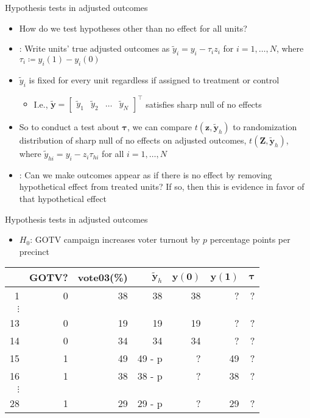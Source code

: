 \documentclass[table, xcolor = {dvipsnames}, 9pt]{beamer}
\theoremstyle{plain}
\begin{document}
\begin{frame}{Hypothesis tests in adjusted outcomes}
\vfill
\begin{itemize} 
\item How do we test hypotheses other than no effect for all units? \vfill
\item \citet{rosenbaum2002a,rosenbaum2010,rosenbaum2017a}: Write units' true adjusted outcomes as $\tilde{y}_i = y_i - \tau_i z_i$ for $i = 1, \ldots , N$, where $\tau_i \coloneqq y_i(1) - y_i(0)$ \vfill
\item $\tilde{y}_i$ is fixed for every unit regardless if assigned to treatment or control
\begin{itemize} \vfill
\item I.e., $\bm{\tilde{y}} = \begin{bmatrix} \tilde{y}_1 & \tilde{y}_2 & \ldots & \tilde{y}_N \end{bmatrix}^{\top}$ satisfies sharp null of no effects \vfill
\end{itemize}
\item So to conduct a test about $\bm{\tau}$, we can compare $t(\bm{z}, \bm{\tilde{y}}_{h})$ to randomization distribution of sharp null of no effects on adjusted outcomes, $t(\bm{Z}, \bm{\tilde{y}}_{h})$, where $\tilde{y}_{hi} = y_i - z_i \tau_{hi}$ for all $i = 1, \ldots , N$ \vfill
\item {}: Can we make outcomes appear as if there is no effect by removing hypothetical effect from treated units? If so, then this is evidence in favor of that hypothetical effect
\end{itemize}
\vfill
\end{frame}
\begin{frame}{Hypothesis tests in adjusted outcomes}
\begin{itemize}
\item $H_0$: GOTV campaign increases voter turnout by $p$ percentage points per precinct  
\end{itemize}
\begin{center}
  \begin{tabular}{r|rr|rrrr}
  \hline
 & GOTV? & vote03(\%)& $\bm{\tilde{y}}_h$ & $\bm{y}(\bm{0})$ & $\bm{y}(\bm{1})$ & $\bm{\tau}$\\
  \hline
1 & 0 & 38 & 38 & 38 & ? & ?\\
$\vdots$& & & & & & \\
13 & 0 & 19 & 19 & 19& ? & ?\\
14 & 0 & 34 & 34 & 34& ? & ?\\
15 & 1 & 49 & 49 - p & ?& 49 & ?\\
16 & 1 & 38 & 38 - p & ?& 38 & ?\\
$\vdots$& & & & & & \\
28 & 1 & 29 & 29 - p & ?& 29 & ? \\
   \hline
\end{tabular}
\end{center}
\end{frame}
\end{document}
